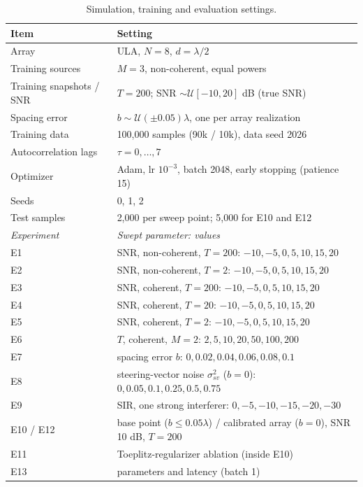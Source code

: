 \begin{table}[h!]
\centering
\small
\caption{Simulation, training and evaluation settings.}
\label{tab:settings}
\begin{tabular}{ll}
\toprule
Item & Setting \\
\midrule
Array & ULA, $N=8$, $d=\lambda/2$ \\
Training sources & $M=3$, non-coherent, equal powers \\
Training snapshots / SNR & $T=200$; SNR $\sim\mathcal{U}[-10,20]$ dB (true SNR) \\
Spacing error & $b\sim\mathcal{U}(\pm0.05)\lambda$, one per array realization \\
Training data & 100,000 samples (90k / 10k), data seed 2026 \\
Autocorrelation lags & $\tau=0,\dots,7$ \\
Optimizer & Adam, lr $10^{-3}$, batch 2048, early stopping (patience 15) \\
Seeds & 0, 1, 2 \\
Test samples & 2,000 per sweep point; 5,000 for E10 and E12 \\
\midrule
\textit{Experiment} & \textit{Swept parameter: values} \\
\midrule
E1 & SNR, non-coherent, $T=200$: $-10, -5, 0, 5, 10, 15, 20$ \\
E2 & SNR, non-coherent, $T=2$: $-10, -5, 0, 5, 10, 15, 20$ \\
E3 & SNR, coherent, $T=200$: $-10, -5, 0, 5, 10, 15, 20$ \\
E4 & SNR, coherent, $T=20$: $-10, -5, 0, 5, 10, 15, 20$ \\
E5 & SNR, coherent, $T=2$: $-10, -5, 0, 5, 10, 15, 20$ \\
E6 & $T$, coherent, $M=2$: $2, 5, 10, 20, 50, 100, 200$ \\
E7 & spacing error $b$: $0, 0.02, 0.04, 0.06, 0.08, 0.1$ \\
E8 & steering-vector noise $\sigma^2_{sv}$ ($b=0$): $0, 0.05, 0.1, 0.25, 0.5, 0.75$ \\
E9 & SIR, one strong interferer: $0, -5, -10, -15, -20, -30$ \\
E10 / E12 & base point ($b\le0.05\lambda$) / calibrated array ($b=0$), SNR 10 dB, $T=200$ \\
E11 & Toeplitz-regularizer ablation (inside E10) \\
E13 & parameters and latency (batch 1) \\
\hline
\end{tabular}
\end{table}
